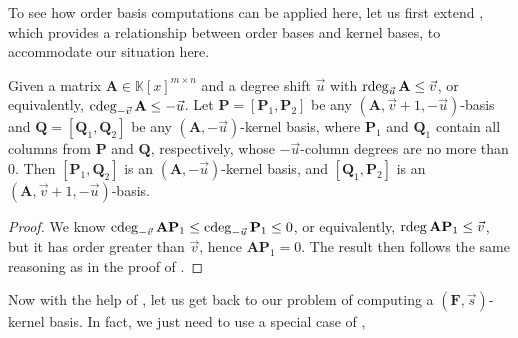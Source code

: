 To see how order basis computations can be applied here, let us first
extend , which provides
a relationship between order bases and kernel bases, to accommodate
our situation here.
\begin{lem}
\label{lem:orderbasisContainsNullspacebasisGeneralized}Given a matrix
$\mathbf{A}\in\mathbb{K}\left[x\right]^{m\times n}$ and a degree
shift $\vec{u}$ with $\rdeg_{\vec{u}}\mathbf{A}\le\vec{v}$, or equivalently,
$\cdeg_{-\vec{v}}\mathbf{A}\le-\vec{u}$. Let $\mathbf{P}=\left[\mathbf{P}_{1},\mathbf{P}_{2}\right]$
be any $\left(\mathbf{A},\vec{v}+1,-\vec{u}\right)$-basis and $\mathbf{Q}=\left[\mathbf{Q}_{1},\mathbf{Q}_{2}\right]$
be any $(\mathbf{A},-\vec{u})$-kernel basis, where $\mathbf{P}_{1}$
and $\mathbf{Q}_{1}$ contain all columns from $\mathbf{P}$ and $\mathbf{Q}$,
respectively, whose $-\vec{u}$-column degrees are no more than $0$.
Then $\left[\mathbf{P}_{1},\mathbf{Q}_{2}\right]$ is an $(\mathbf{A},-\vec{u})$-kernel
basis, and $\left[\mathbf{Q}_{1},\mathbf{P}_{2}\right]$ is an $\left(\mathbf{A},\vec{v}+1,-\vec{u}\right)$-basis.\end{lem}
\begin{proof}
We know $\cdeg_{-\vec{v}}\mathbf{A}\mathbf{P}_{1}\le\cdeg_{-\vec{u}}\mathbf{P}_{1}\le0$,
or equivalently, $\rdeg\mathbf{A}\mathbf{P}_{1}\le\vec{v}$, but it
has order greater than $\vec{v}$, hence $\mathbf{A}\mathbf{P}_{1}=0$.
The result then follows the same reasoning as in the proof of .%
\begin{comment}
We know $\cdeg\mathbf{P}_{1}^{T}\le\vec{u}$ from $\cdeg_{-\vec{u}}\mathbf{P}_{1}\le0$,
hence $\cdeg\mathbf{P}_{1}^{T}\mathbf{A}^{T}\le\cdeg_{\vec{u}}\mathbf{A}^{T}$
by \prettyref{lem:boundOnDegreesOfFA}. Now for each row $\mathbf{a}_{i}$
in $\mathbf{A}$ and its $\vec{u}$-column degree $v_{i}$, we have
\[
\rdeg\mathbf{a}_{i}\mathbf{P}_{1}=\cdeg\mathbf{P}_{1}^{T}\mathbf{a}_{i}^{T}\le\cdeg_{\vec{u}}\mathbf{a}_{i}^{T}=v_{i},
\]
 and $\mathbf{a}_{i}\mathbf{P}_{1}\equiv0\mod x^{v_{i}+1}$, hence
$\mathbf{A}\mathbf{P}_{1}=0$. The result then follows the same reasoning
as in the proof of \prettyref{lem:orderBasisContainsNullspaceBasis}.
\end{comment}

\end{proof}
Now with the help of ,
let us get back to our problem of computing a $(\mathbf{F},\vec{s})$-kernel
basis.  In fact, we just need to use a special case of ,
